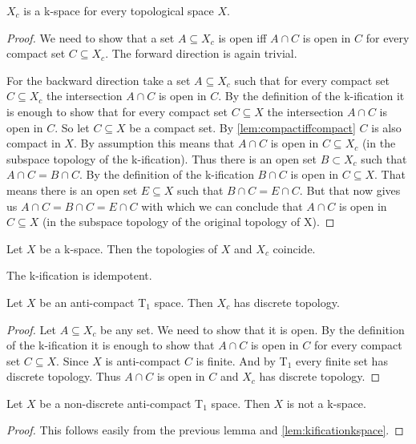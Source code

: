 \begin{lem}
    $X_c$ is a k-space for every topological space $X$.
\end{lem}
\begin{proof}
    We need to show that a set $A \subseteq X_c$ is open iff $A \cap C$ is open in $C$ for every compact set $C \subseteq X_c$. The forward direction is again trivial. 
    
    For the backward direction take a set $A \subseteq X_c$ such that for every compact set $C \subseteq X_c$ the intersection $A \cap C$ is open in $C$. 
    By the definition of the k-ification it is enough to show that for every compact set $C \subseteq X$ the intersection $A \cap C$ is open in $C$. So let $C \subseteq X$ be a compact set. 
    By \ref{lem:compactiffcompact} $C$ is also compact in $X$.
    By assumption this means that $A \cap C$ is open in $C \subseteq X_c$ (in the subspace topology of the k-ification). Thus there is an open set $B \subset X_c$ such that $A \cap C = B \cap C$. 
    By the definition of the k-ification $B \cap C$ is open in $C \subseteq X$. 
    That means there is an open set $E \subseteq X$ such that $B \cap C = E \cap C$. 
    But that now gives us $A \cap C = B \cap C = E \cap C$ with which we can conclude that $A \cap C$ is open in $C \subseteq X$ (in the subspace topology of the original topology of X).
\end{proof}

\begin{lem}\label{lem:kificationkspace}
    Let $X$ be a k-space.
    Then the topologies of $X$ and $X_c$ coincide.
\end{lem}

\begin{cor}
    The k-ification is idempotent.
\end{cor}
\begin{lem}
    Let $X$ be an anti-compact T$_1$ space.
    Then $X_c$ has discrete topology.
\end{lem}
\begin{proof}
    Let $A \subseteq X_c$ be any set. We need to show that it is open. 
    By the definition of the k-ification it is enough to show that $A \cap C$
    is open in $C$ for every compact set $C \subseteq X$. 
    Since $X$ is anti-compact $C$ is finite.
    And by T$_1$ every finite set has discrete topology. 
    Thus $A \cap C$ is open in $C$ and $X_c$ has discrete topology.
\end{proof}

\begin{cor}
    Let $X$ be a non-discrete anti-compact T$_1$ space. 
    Then $X$ is not a k-space.
\end{cor}
\begin{proof}
    This follows easily from the previous lemma and \ref{lem:kificationkspace}.
\end{proof}